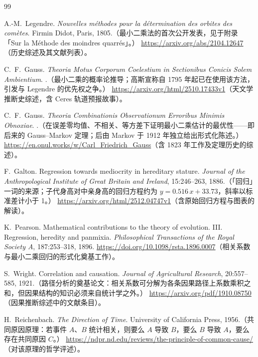 \documentclass[11pt, a4paper]{ctexart}
\theoremstyle{plain}
\theoremstyle{definition}
\theoremstyle{remark}
\begin{document}

\begin{thebibliography}{99}\small

A.-M.~Legendre.
\newblock \emph{Nouvelles m\'ethodes pour la d\'etermination des orbites des com\`etes}.
\newblock Firmin Didot, Paris, 1805.（最小二乘法的首次公开发表，见于附录「Sur la M\'ethode des moindres quarr\'es」。）
\newblock \url{https://arxiv.org/abs/2104.12647}（历史综述及其文献列表）。

C.~F.~Gauss.
\newblock \emph{Theoria Motus Corporum Coelestium in Sectionibus Conicis Solem Ambientium}.
.（最小二乘的概率论推导；高斯宣称自 1795 年起已在使用该方法，引发与 Legendre 的优先权之争。）
\newblock \url{https://arxiv.org/html/2510.17433v1}（天文学推断史综述，含 Ceres 轨道预报故事）。

C.~F.~Gauss.
\newblock \emph{Theoria Combinationis Observationum Erroribus Minimis Obnoxiae}.
.（在误差零均值、不相关、等方差下证明最小二乘估计的最优性——即后来的 Gauss--Markov 定理；后由 Markov 于 1912 年独立给出形式化陈述。）
\newblock \url{https://en.onul.works/w/Carl_Friedrich_Gauss}（含 1823 年工作及定理历史的综述）。

F.~Galton.
\newblock Regression towards mediocrity in hereditary stature.
\newblock \emph{Journal of the Anthropological Institute of Great Britain and Ireland}, 15:246--263, 1886.（「回归」一词的来源；子代身高对中亲身高的回归方程约为 $y = 0.516\,x + 33.73$，斜率以标准差计小于 1。）
\newblock \url{https://arxiv.org/html/2512.04747v1}（含原始回归方程与图表的解读）。

K.~Pearson.
\newblock Mathematical contributions to the theory of evolution. III. Regression, heredity and panmixia.
\newblock \emph{Philosophical Transactions of the Royal Society A}, 187:253--318, 1896.
\newblock \url{https://doi.org/10.1098/rsta.1896.0007}（相关系数与最小二乘回归的形式化奠基工作）。

S.~Wright.
\newblock Correlation and causation.
\newblock \emph{Journal of Agricultural Research}, 20:557--585, 1921.（路径分析的奠基论文：相关系数可分解为各条因果路径上系数乘积之和，但因果结构的知识必须来自统计学之外。）
\newblock \url{https://arxiv.org/pdf/1910.08750}（因果推断综述中的文献条目）。

H.~Reichenbach.
\newblock \emph{The Direction of Time}.
\newblock University of California Press, 1956.（共同原因原理：若事件 $A$、$B$ 统计相关，则要么 $A$ 导致 $B$，要么 $B$ 导致 $A$，要么存在共同原因 $C$。）
\newblock \url{https://ndpr.nd.edu/reviews/the-principle-of-common-cause/}（对该原理的哲学评述）。


\end{thebibliography}
\end{document}
